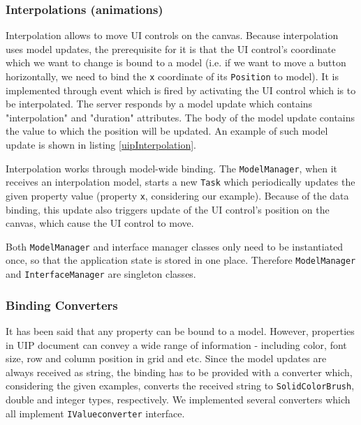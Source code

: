 \subsubsection{Interpolations (animations)}
Interpolation allows to move UI controls on the canvas. Because interpolation uses model updates, the prerequisite for it is that the UI control's coordinate which we want to change is bound to a model (i.e. if we want to move a button horizontally, we need to bind the \texttt{x} coordinate of its \texttt{Position} to model). It is implemented through event which is fired by activating the UI control which is to be interpolated. The server responds by a model update which contains "interpolation" and "duration" attributes. The body of the model update contains the value to which the position will be updated. An example of such model update is shown in listing \ref{uipInterpolation}.



Interpolation works through model-wide binding. The \texttt{ModelManager}, when it receives an interpolation model, starts a new \texttt{Task} which periodically updates the given property value (property \texttt{x}, considering our example). Because of the data binding, this update also triggers update of the UI control's position on the canvas, which cause the UI control to move.

Both \texttt{ModelManager} and interface manager classes only need to be instantiated once, so that the application state is stored in one place. Therefore \texttt{ModelManager} and \texttt{InterfaceManager} are singleton classes.

\subsubsection{Binding Converters}
It has been said that any property can be bound to a model. However, properties in UIP document can convey a wide range of information - including color, font size, row and column position in grid and etc. Since the model updates are always received as string, the binding has to be provided with a converter which, considering the given examples, converts the received string to \texttt{SolidColorBrush}, double and integer types, respectively. We implemented several converters which all implement \texttt{IValueconverter} interface.

